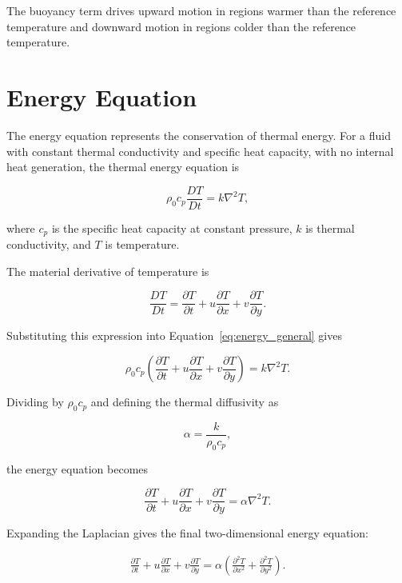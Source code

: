 \documentclass{article}
\begin{document}
The buoyancy term drives upward motion in regions warmer
than the reference temperature and downward motion in
regions colder than the reference temperature.

\section{Energy Equation}

The energy equation represents the conservation of thermal
energy. For a fluid with constant thermal conductivity and
specific heat capacity, with no internal heat generation,
the thermal energy equation is

\begin{equation}
\rho_0c_p\frac{DT}{Dt}
=k\nabla^2T,
\label{eq:energy_general}
\end{equation}

where $c_p$ is the specific heat capacity at constant
pressure, $k$ is thermal conductivity, and $T$ is temperature.

The material derivative of temperature is

\begin{equation}
\frac{DT}{Dt}
=\frac{\partial T}{\partial t}
+u\frac{\partial T}{\partial x}
+v\frac{\partial T}{\partial y}.
\end{equation}

Substituting this expression into
Equation~\eqref{eq:energy_general} gives

\begin{equation}
\rho_0c_p\left(
\frac{\partial T}{\partial t}
+u\frac{\partial T}{\partial x}
+v\frac{\partial T}{\partial y}
\right)
=k\nabla^2T.
\end{equation}

Dividing by $\rho_0c_p$ and defining the thermal
diffusivity as

\begin{equation}
\alpha=\frac{k}{\rho_0c_p},
\end{equation}

the energy equation becomes

\begin{equation}
\frac{\partial T}{\partial t}
+u\frac{\partial T}{\partial x}
+v\frac{\partial T}{\partial y}
=\alpha\nabla^2T.
\end{equation}

Expanding the Laplacian gives the final two-dimensional
energy equation:

\begin{equation}
\boxed{
\begin{aligned}
\frac{\partial T}{\partial t}
+u\frac{\partial T}{\partial x}
+v\frac{\partial T}{\partial y}
=\alpha\left(
\frac{\partial^2T}{\partial x^2}
+\frac{\partial^2T}{\partial y^2}
\right).
\end{aligned}
}
\label{eq:energy}
\end{equation}
\end{document}
